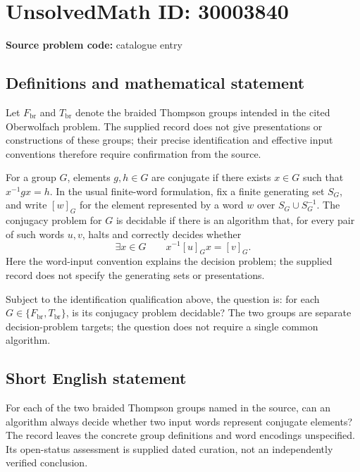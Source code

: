 \documentclass[11pt]{article}
\begin{document}
\section*{UnsolvedMath ID: 30003840}
\textbf{Source problem code:} catalogue entry
\subsection{Definitions and mathematical statement}
Let \(F_{\mathrm{br}}\) and \(T_{\mathrm{br}}\) denote the braided Thompson groups intended in the cited Oberwolfach problem. The supplied record does not give presentations or constructions of these groups; their precise identification and effective input conventions therefore require confirmation from the source.

For a group \(G\), elements \(g,h\in G\) are conjugate if there exists \(x\in G\) such that \(x^{-1}gx=h\). In the usual finite-word formulation, fix a finite generating set \(S_G\), and write \([w]_G\) for the element represented by a word \(w\) over \(S_G\cup S_G^{-1}\). The conjugacy problem for \(G\) is decidable if there is an algorithm that, for every pair of such words \(u,v\), halts and correctly decides whether
\[
\exists x\in G\qquad x^{-1}[u]_Gx=[v]_G.
\]
Here the word-input convention explains the decision problem; the supplied record does not specify the generating sets or presentations.

Subject to the identification qualification above, the question is: for each \(G\in\{F_{\mathrm{br}},T_{\mathrm{br}}\}\), is its conjugacy problem decidable? The two groups are separate decision-problem targets; the question does not require a single common algorithm.
\subsection{Short English statement}
For each of the two braided Thompson groups named in the source, can an algorithm always decide whether two input words represent conjugate elements? The record leaves the concrete group definitions and word encodings unspecified. Its open-status assessment is supplied dated curation, not an independently verified conclusion.
\end{document}
